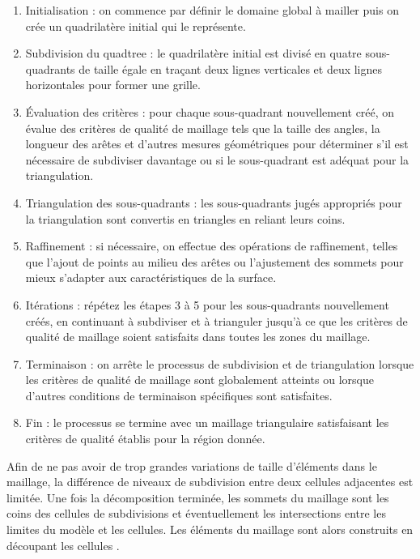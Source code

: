 \begin{enumerate}
    \item Initialisation : on commence par définir le domaine global à mailler puis on crée un quadrilatère initial qui le représente.
    
    \item Subdivision du quadtree : le quadrilatère initial est divisé en quatre sous-quadrants de taille égale en traçant deux lignes verticales et deux lignes horizontales pour former une grille.
    
    \item Évaluation des critères : pour chaque sous-quadrant nouvellement créé, on évalue des critères de qualité de maillage tels que la taille des angles, la longueur des arêtes et d'autres mesures géométriques pour déterminer s'il est nécessaire de subdiviser davantage ou si le sous-quadrant est adéquat pour la triangulation.
    
    \item Triangulation des sous-quadrants : les sous-quadrants jugés appropriés pour la triangulation sont convertis en triangles en reliant leurs coins.
    
    \item Raffinement : si nécessaire, on effectue des opérations de raffinement, telles que l'ajout de points au milieu des arêtes ou l'ajustement des sommets pour mieux s'adapter aux caractéristiques de la surface.
    
    \item Itérations : répétez les étapes 3 à 5 pour les sous-quadrants nouvellement créés, en continuant à subdiviser et à trianguler jusqu'à ce que les critères de qualité de maillage soient satisfaits dans toutes les zones du maillage.
    
    \item Terminaison : on arrête le processus de subdivision et de triangulation lorsque les critères de qualité de maillage sont globalement atteints ou lorsque d'autres conditions de terminaison spécifiques sont satisfaites.
    
    \item Fin : le processus se termine avec un maillage triangulaire satisfaisant les critères de qualité établis pour la région donnée.
\end{enumerate}

Afin de ne pas avoir de trop grandes variations de taille d’éléments dans le maillage, la différence de niveaux de subdivision entre deux cellules adjacentes est limitée. Une fois la décomposition terminée, les sommets du maillage sont les coins des cellules de subdivisions et éventuellement les intersections entre les limites du modèle et les cellules. Les éléments du maillage sont alors construits en découpant les cellules \cite{botella2016generation} .


